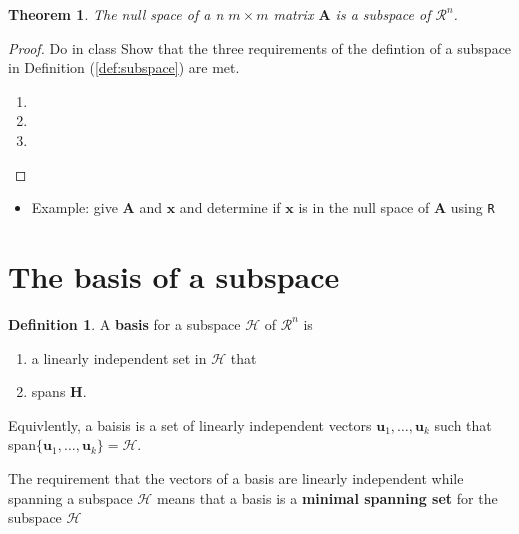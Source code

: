 \documentclass[
]{book}
\providecommand{\tightlist}{%
  \setlength{\itemsep}{0pt}\setlength{\parskip}{0pt}}
\newtheorem{theorem}{Theorem}[chapter]
\theoremstyle{definition}
\newtheorem{definition}{Definition}[chapter]
\theoremstyle{definition}
\theoremstyle{definition}
\theoremstyle{definition}
\theoremstyle{remark}
\begin{document}
\begin{theorem}
The null space of a n \(m \times m\) matrix \(\mathbf{A}\) is a subspace of \(\mathcal{R}^n\).
\end{theorem}

\begin{proof}

Do in class
Show that the three requirements of the defintion of a subspace in Definition (\ref{def:subspace}) are met.

\begin{enumerate}
\def\labelenumi{\arabic{enumi})}
\item
\item
\item
\end{enumerate}

\end{proof}

\begin{itemize}
\tightlist
\item
  Example: give \(\mathbf{A}\) and \(\mathbf{x}\) and determine if \(\mathbf{x}\) is in the null space of \(\mathbf{A}\) using \texttt{R}
\end{itemize}

\hypertarget{the-basis-of-a-subspace}{%
\section{The basis of a subspace}\label{the-basis-of-a-subspace}}

\begin{definition}
\protect\hypertarget{def:basis}{}\label{def:basis}A \textbf{basis} for a subspace \(\mathcal{H}\) of \(\mathcal{R}^n\) is

\begin{enumerate}
\def\labelenumi{\arabic{enumi})}
\tightlist
\item
  a linearly independent set in \(\mathcal{H}\) that
\item
  spans \(\mathbf{H}\).
\end{enumerate}

Equivlently, a baisis is a set of linearly independent vectors \(\mathbf{u}_1, \ldots, \mathbf{u}_k\) such that span\(\{\mathbf{u}_1, \ldots, \mathbf{u}_k\} = \mathcal{H}\).
\end{definition}

The requirement that the vectors of a basis are linearly independent while spanning a subspace \(\mathcal{H}\) means that a basis is a \textbf{minimal spanning set} for the subspace \(\mathcal{H}\)
\end{document}
